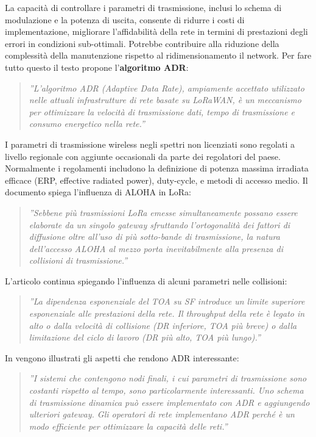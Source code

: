 \documentclass[a4paper]{report} %
\begin{document}
La capacità di controllare i parametri di trasmissione, inclusi lo schema di modulazione e la potenza di uscita, consente di ridurre i costi di implementazione, migliorare l'affidabilità della rete in termini di prestazioni degli errori in condizioni sub-ottimali. Potrebbe contribuire alla riduzione della complessità della manutenzione rispetto al ridimensionamento il network. Per fare tutto questo il testo \cite{art:rif.48} propone l'\textbf{algoritmo ADR}:
\begin{quote}
	\textit{''L'algoritmo ADR (Adaptive Data Rate), ampiamente accettato utilizzato nelle attuali infrastrutture di rete basate su LoRaWAN, è un meccanismo per ottimizzare la velocità di trasmissione dati, tempo di trasmissione e consumo energetico nella rete.''}
\end{quote}	
I parametri di trasmissione wireless negli spettri non licenziati sono regolati a livello regionale con aggiunte occasionali da parte dei regolatori del paese. Normalmente i regolamenti includono la definizione di potenza massima irradiata efficace (ERP, effective radiated power), duty-cycle, e metodi di accesso medio. Il documento \cite{art:rif.48} spiega l'influenza di ALOHA in LoRa:
\begin{quote}
	\textit{''Sebbene più trasmissioni LoRa emesse simultaneamente possano essere elaborate da un singolo gateway sfruttando l'ortogonalità dei fattori di diffusione oltre all'uso di più sotto-bande di trasmissione, la natura dell'accesso ALOHA al mezzo porta inevitabilmente alla presenza di collisioni di trasmissione.''}
\end{quote}
L'articolo continua spiegando l'influenza di alcuni parametri nelle collisioni:	 
\begin{quote}
	\textit{''La dipendenza esponenziale del TOA su SF introduce un limite superiore esponenziale alle prestazioni della rete. Il throughput della rete è legato in alto o dalla velocità di collisione (DR inferiore, TOA più breve) o dalla limitazione del ciclo di lavoro (DR più alto, TOA più lungo).''}
\end{quote}	
In \cite{art:rif.48} vengono illustrati gli aspetti che rendono ADR interessante:
\begin{quote}
	\textit{''I sistemi che contengono nodi finali, i cui parametri di trasmissione sono costanti rispetto al tempo, sono particolarmente interessanti. Uno schema di trasmissione dinamica può essere implementato con ADR e aggiungendo ulteriori gateway. Gli operatori di rete implementano ADR perché è un modo efficiente per ottimizzare la capacità delle reti.''}
\end{quote}
	 
\end{document}
